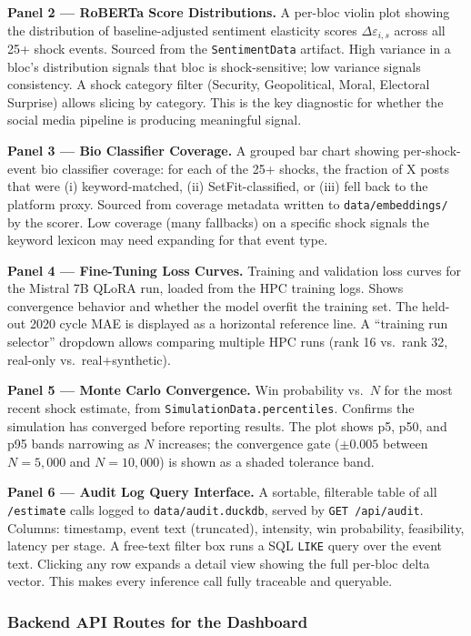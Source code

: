 \documentclass[11pt]{article}
\begin{document}
\textbf{Panel 2 --- RoBERTa Score Distributions.}
A per-bloc violin plot showing the distribution of baseline-adjusted sentiment
elasticity scores $\Delta\varepsilon_{i,s}$ across all 25+ shock events. Sourced
from the \texttt{SentimentData} artifact. High variance in a bloc's distribution
signals that bloc is shock-sensitive; low variance signals consistency. A shock
category filter (Security, Geopolitical, Moral, Electoral Surprise) allows
slicing by category. This is the key diagnostic for whether the social media
pipeline is producing meaningful signal.

\textbf{Panel 3 --- Bio Classifier Coverage.}
A grouped bar chart showing per-shock-event bio classifier coverage: for each of
the 25+ shocks, the fraction of X posts that were (i) keyword-matched, (ii)
SetFit-classified, or (iii) fell back to the platform proxy. Sourced from
coverage metadata written to \texttt{data/embeddings/} by the scorer.
Low coverage (many fallbacks) on a specific shock signals the keyword lexicon
may need expanding for that event type.

\textbf{Panel 4 --- Fine-Tuning Loss Curves.}
Training and validation loss curves for the Mistral 7B QLoRA run, loaded from
the HPC training logs. Shows convergence behavior and whether the model overfit
the training set. The held-out 2020 cycle MAE is displayed as a horizontal
reference line. A ``training run selector'' dropdown allows comparing multiple
HPC runs (rank 16 vs.\ rank 32, real-only vs.\ real+synthetic).

\textbf{Panel 5 --- Monte Carlo Convergence.}
Win probability vs.\ $N$ for the most recent shock estimate, from
\texttt{SimulationData.percentiles}. Confirms the simulation has converged
before reporting results. The plot shows p5, p50, and p95 bands narrowing
as $N$ increases; the convergence gate ($\pm 0.005$ between $N=5{,}000$ and
$N=10{,}000$) is shown as a shaded tolerance band.

\textbf{Panel 6 --- Audit Log Query Interface.}
A sortable, filterable table of all \texttt{/estimate} calls logged to
\texttt{data/audit.duckdb}, served by \texttt{GET /api/audit}. Columns:
timestamp, event text (truncated), intensity, win probability, feasibility,
latency per stage. A free-text filter box runs a SQL \texttt{LIKE} query
over the event text. Clicking any row expands a detail view showing the
full per-bloc delta vector. This makes every inference call fully traceable
and queryable.

\subsubsection*{Backend API Routes for the Dashboard}
\end{document}
